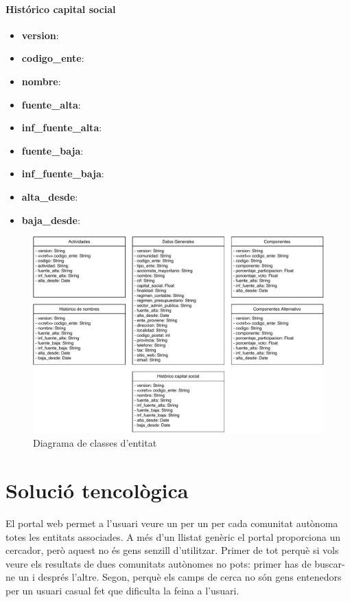 \documentclass[12pt]{article}
\begin{document}
\paragraph{Histórico capital social\\}
\begin{itemize}
    \item \textbf{version}:
    \item \textbf{codigo\_ente}:
    \item \textbf{nombre}:
    \item \textbf{fuente\_alta}:
    \item \textbf{inf\_fuente\_alta}:
    \item \textbf{fuente\_baja}:
    \item \textbf{inf\_fuente\_baja}:
    \item \textbf{alta\_desde}:
    \item \textbf{baja\_desde}:
\end{itemize}

\begin{figure}[H]
    \centering
    \includegraphics[width=0.7\columnwidth]{img/diagrama_classes_entitat.pdf}
    \caption{Diagrama de classes d'entitat} 
    \label{clasesentitat}
\end{figure}

\section*{Solució tencològica}
El portal web permet a l'usuari veure un per un per cada comunitat autònoma totes les entitats associades. A més d'un llistat genèric el portal proporciona un cercador, però aquest no és gens senzill d'utilitzar. Primer de tot perquè si vols veure els resultats de dues comunitats autònomes no pots: primer has de buscar-ne un i després l'altre. Segon, perquè els camps de cerca no són gens entenedors per un usuari casual fet que dificulta la feina a l'usuari.\par
\end{document}
